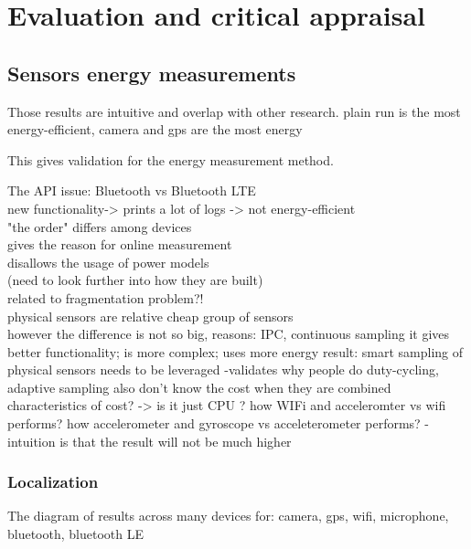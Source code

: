 \section{Evaluation and critical appraisal}
\label{s:evaluation}

\subsection{Sensors energy measurements}




Those results are intuitive and overlap with other research.
	plain run is the most energy-efficient, camera and gps are the most energy 
	
	This gives validation for the energy measurement method.

The API issue: Bluetooth vs Bluetooth LTE\\
	new functionality-> prints a lot of logs -> not energy-efficient\\				
				
"the order" differs among devices\\
	gives the reason for online measurement\\
	disallows the usage of power models\\
		(need to look further into how they are built)\\
		related to fragmentation problem?!\\

physical sensors are relative cheap group of sensors \\
	however the difference is not so big,
		reasons: IPC, continuous sampling
			it gives better functionality; is more complex; uses more energy
		result: smart sampling of physical sensors needs to be leveraged
			-validates why people do duty-cycling, adaptive sampling
	also don't know the cost when they are combined
		characteristics of cost? -> is it just CPU ?
			how WIFi and acceleromter vs wifi performs?
			how accelerometer and gyroscope vs acceleterometer performs?
				-intuition is that the result will not be much higher
		
		
\subsubsection{Localization}

The diagram of results across many devices for: camera, gps, wifi, microphone, bluetooth, bluetooth LE

